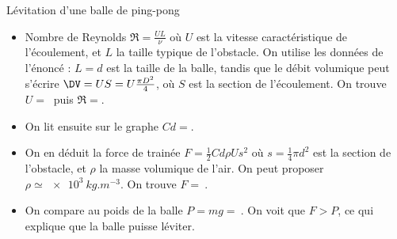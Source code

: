 \begin{exo}[2][oral]{Lévitation d’une balle de ping-pong}
{\begin{itemize}
    \begin{itemize}
      \item
    Nombre de Reynolds $\Re = \frac{UL}{\nu}$ où $U$ est la vitesse caractéristique de l'écoulement, et $L$ la taille typique de l'obstacle. On utilise les données de l'énoncé : $L=d$ est la taille de la balle, tandis que le débit volumique peut s'écrire $\DV = U S = U \frac{\pi D^2}{4}$, où $S$ est la section de l'écoulement. On trouve $U=\SI{}{}$ puis $\Re = $.
    \item On lit ensuite sur le graphe $Cd = $.
    \item On en déduit la force de trainée $F = \frac{1}{2} Cd \rho U s^2$ où $s=\frac{1}{4}\pi d^2$
    est la section de l'obstacle, et $\rho$ la masse volumique de l'air. On peut proposer $\rho \simeq \SI{e3}{kg.m^{-3}}$. On trouve $F = \SI{}{}$.
    \item On compare au poids de la balle $P=mg = \SI{}{}$. On voit que $F>P$, ce qui explique que la balle puisse léviter.
  \end{itemize}
  \end{itemize}
  }
  \end{exo}
